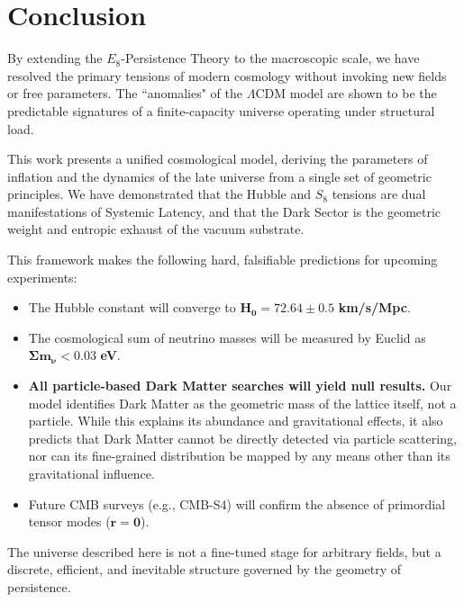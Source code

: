 \section{Conclusion}
By extending the $E_8$-Persistence Theory to the macroscopic scale, we have resolved the primary tensions of modern cosmology without invoking new fields or free parameters. The ``anomalies" of the $\Lambda$CDM model are shown to be the predictable signatures of a finite-capacity universe operating under structural load.

This work presents a unified cosmological model, deriving the parameters of inflation and the dynamics of the late universe from a single set of geometric principles. We have demonstrated that the Hubble and $S_8$ tensions are dual manifestations of Systemic Latency, and that the Dark Sector is the geometric weight and entropic exhaust of the vacuum substrate.

This framework makes the following hard, falsifiable predictions for upcoming experiments:
\begin{itemize}
    \item The Hubble constant will converge to $\mathbf{H_0 = 72.64 \pm 0.5}$ \textbf{km/s/Mpc}.
    \item The cosmological sum of neutrino masses will be measured by Euclid as $\mathbf{\Sigma m_\nu < 0.03}$ \textbf{eV}.
    \item \textbf{All particle-based Dark Matter searches will yield null results.} Our model identifies Dark Matter as the geometric mass of the lattice itself, not a particle. While this explains its abundance and gravitational effects, it also predicts that Dark Matter cannot be directly detected via particle scattering, nor can its fine-grained distribution be mapped by any means other than its gravitational influence.
    \item Future CMB surveys (e.g., CMB-S4) will confirm the absence of primordial tensor modes ($\mathbf{r=0}$).
\end{itemize}
The universe described here is not a fine-tuned stage for arbitrary fields, but a discrete, efficient, and inevitable structure governed by the geometry of persistence.
